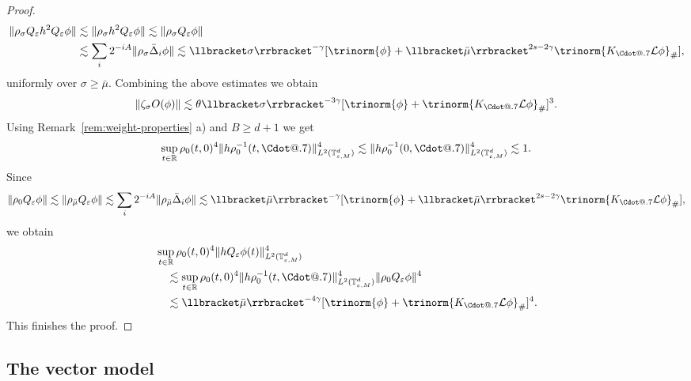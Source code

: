 \documentclass{article}
\makeatletter
\numberwithin{equation}{section}
\newcommand*\Cdot{{\mathpalette\Cdot@{.7}}}
\newcommand*\Cdot@[2]{\mathbin{\vcenter{\hbox{\scalebox{#2}{\hspace{0.1mm}$\m@th#1\bullet$\hspace{0.1mm}}}}}}
\theoremstyle{plain}
\theoremstyle{definition}
\makeatother
\begin{document}
\begin{proof}
  \begin{align*}
    \| \rho_{\sigma} Q_{\varepsilon} h^2 Q_{\varepsilon} \phi \| &\lesssim 
    \|\rho_{\sigma} h^2 Q_{\varepsilon} \phi \|  \lesssim \| \rho_{\sigma} Q_{\varepsilon}
    \phi \|\\
 &\lesssim  \sum_i 2^{- i A}  \| \rho_{\sigma}  \bar{\Delta}_i  \phi \|
    \lesssim \llbracket \sigma \rrbracket^{- \gamma}  [\trinorm{ \phi
    } + \llbracket \bar{\mu} \rrbracket^{2 s - 2 \gamma} \trinorm{
    K_{\Cdot} \mathcal{L} \phi }_{\#}],
  \end{align*}
  uniformly over $\sigma \geqslant \bar{\mu}$. Combining the above estimates
  we obtain
  \[ \| \zeta_{\sigma} O (\phi) \| \lesssim \theta \llbracket \sigma
     \rrbracket^{- 3 \gamma}  [\trinorm{ \phi } + \trinorm{
     K_{\Cdot} \mathcal{L} \phi }_{\#}]^3 . \]
  Using Remark~\ref{rem:weight-properties} a) and $B \geqslant d + 1$ we get
  \[ \sup_{t \in \mathbb{R}} \rho_0 (t, 0)^4  \| h \rho^{- 1}_0 (t, \Cdot)
     \|_{L^2 (\mathbb{T}^d_{\varepsilon, M})}^4 \lesssim \| h \rho^{- 1}_0 (0,
     \Cdot) \|_{L^2 (\mathbb{T}^d_{\varepsilon, M})}^4 \lesssim 1. \]
  Since
  \[ \| \rho_0 Q_{\varepsilon} \phi \| \lesssim \| \rho_{\bar{\mu}}
     Q_{\varepsilon} \phi \| \lesssim \sum_i 2^{- i A} \| \rho_{\bar{\mu}} \bar{\Delta}_i 
     \phi \| \lesssim \llbracket \bar{\mu} \rrbracket^{- \gamma}  [\trinorm{
     \phi } + \llbracket \bar{\mu} \rrbracket^{2 s - 2 \gamma}
     \trinorm{ K_{\Cdot} \mathcal{L} \phi }_{\#}], \]
  we obtain
  \begin{align*}
       &\sup_{t \in \mathbb{R}} \rho_0 (t, 0)^4
       \| hQ_{\varepsilon} \phi (t) \|_{L^2
       (\mathbb{T}^d_{\varepsilon, M})}^4\\
       &\quad \lesssim \sup_{t \in \mathbb{R}} \rho_0 (t, 0)^4
       \| h \rho^{- 1}_0 (t, \Cdot) \|_{L^2
       (\mathbb{T}^d_{\varepsilon, M})}^4
       \| \rho_0 Q_{\varepsilon} \phi \|^4\\
       &\quad \lesssim \llbracket \bar{\mu} \rrbracket^{- 4 \gamma}
       [\trinorm{ \phi } + \trinorm{ K_{\Cdot}
       \mathcal{L} \phi }_{\#}]^4 .
  \end{align*}
  This finishes the proof.
\end{proof}

\subsection{The vector model}\label{sec:vector}
\end{document}

